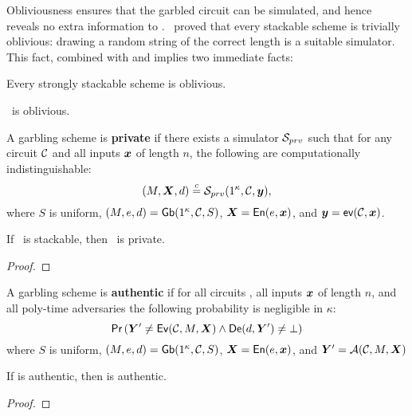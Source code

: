 Obliviousness ensures that the garbled circuit can be simulated, and
hence reveals no extra information to \E.
\HK\ proved that every stackable scheme is trivially oblivious:
drawing a random string of the correct length is a suitable simulator.
This fact, combined with  and
 implies two
immediate facts:
\begin{lemma}\label{lemma:obliviousness}
  Every strongly stackable scheme is oblivious.
\end{lemma}
\begin{theorem}\label{thm:oblivious}
  \ourscheme\ is oblivious.
\end{theorem}

\begin{definition}[Privacy]\label{def:privacy}
  A garbling scheme is \textbf{private} if
  there exists a simulator $\mathcal{S}_{prv}$ such that for
  any circuit $\mathcal C$
  and all inputs $\cirinp$ of length $n$,
  the following are computationally indistinguishable:
   \[
  (\mat, \gcirinp, d)
  \indist
  \simulator_{prv}(1^\kappa, \cir, \cirout),
  \]
  where
  $S$ is uniform,
   $(M, e, d) = \textsf{Gb}(1^\kappa,\mathcal C,S)$,
  $\gcirinp = \gEn(e,\cirinp)$,
  and $\cirout = \gev(\cir,\cirinp)$. 
\end{definition}

\begin{theorem}
  If \underscheme\ is stackable, then \ourscheme\ is private.
\end{theorem}
\begin{proof}
\end{proof}

\begin{definition}[Authenticity]\label{def:authenticity}
  A garbling scheme is \textbf{authentic} if for
  all circuits \cir,
  all inputs $\cirinp$ of length $n$,
  and all poly-time adversaries \adv 
  the following probability is negligible in $\kappa$:
  \[
    \pr{\gcirout' \neq \gEv(\cir, \mat,\gcirinp)
    \land
    \gDe(d, \gcirout') \neq \bot}
  \]
  where
  $S$ is uniform,
  $(M, e, d) = \textsf{Gb}(1^\kappa,\mathcal C,S)$,
  $\gcirinp = \gEn(e,\cirinp)$,
  and $\gcirout' = \adv(\cir, \mat, \gcirinp)$
\end{definition}

\begin{theorem}\label{theorem:authenticity}
  If \underscheme is authentic, then \ourscheme is authentic.
\end{theorem}
\begin{proof}
\end{proof}
